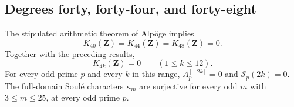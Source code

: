 \subsection{Degrees forty, forty-four, and forty-eight}
\label{sec:k40-k44-k48}

\begin{theorem}[K17-K40-K44-K48]\label{thm:k40-k44-k48}
The stipulated arithmetic theorem of Alp\"oge implies
\[
               K_{40}(\mathbf Z)=K_{44}(\mathbf Z)
                               =K_{48}(\mathbf Z)=0.
 \tag{HK3.1}
\]
Together with the preceding results,
\[
                K_{4k}(\mathbf Z)=0\qquad(1\leq k\leq12).
 \tag{HK3.2}
\]
For every odd prime $p$ and every $k$ in this range,
$A_p^{[-2k]}=0$ and $\mathcal S_p(2k)=0$.
The full-domain Soul\'e characters $\kappa_m$ are surjective
for every odd $m$ with $3\leq m\leq25$, at every odd prime $p$.
\end{theorem}

